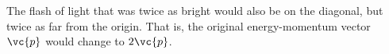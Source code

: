 The flash of light that was twice as bright would also be on the diagonal,
but twice as far from the origin. That is, the original energy-momentum
vector $\vc{p}$ would change to $2\vc{p}$.
